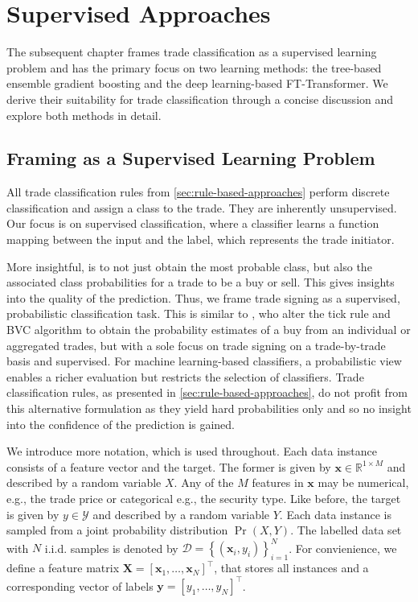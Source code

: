 
\section{Supervised Approaches}\label{sec:supervised-approaches}

The subsequent chapter frames trade classification as a supervised learning problem and has the primary focus on two learning methods: the tree-based ensemble gradient boosting and the deep learning-based FT-Transformer. We derive their suitability for trade classification through a concise discussion and explore both methods in detail.

\subsection{Framing as a Supervised Learning Problem}\label{sec:problem-framing}

All trade classification rules from \cref{sec:rule-based-approaches} perform discrete classification and assign a class to the trade. They are inherently unsupervised. Our focus is on supervised classification, where a classifier learns a function mapping between the input and the label, which represents the trade initiator.

More insightful, is to not just obtain the most probable class, but also the associated class probabilities for a trade to be a buy or sell. This gives insights into the quality of the prediction.
Thus, we frame trade signing as a supervised, probabilistic classification task. This is similar to \textcite[][272]{easleyDiscerningInformationTrade2016}, who alter the tick rule and \gls{BVC} algorithm to obtain the probability estimates of a buy from an individual or aggregated trades, but with a sole focus on trade signing on a trade-by-trade basis and supervised. For machine learning-based classifiers, a probabilistic view enables a richer evaluation but restricts the selection of classifiers. Trade classification rules, as presented in \cref{sec:rule-based-approaches}, do not profit from this alternative formulation as they yield hard probabilities only and so no insight into the confidence of the prediction is gained.

We introduce more notation, which is used throughout. Each data instance consists of a feature vector and the target. The former is given by $\mathbf{x} \in \mathbb{R}^{1 \times M}$ and described by a random variable $X$. Any of the $M$ features in $\mathbf{x}$ may be numerical, e.g., the trade price or categorical e.g., the security type. Like before, the target is given by $y \in \mathcal{Y}$ and described by a random variable $Y$. Each data instance is sampled from a joint probability distribution $\Pr(X, Y)$. The labelled data set with $N$ i.i.d. samples is denoted by $\mathcal{D} =\left\{\left(\mathbf{x}_i, y_i\right)\right\}_{i=1}^N$. For convienience, we define a feature matrix $\mathbf{X}=\left[\mathbf{x}_1,\ldots, \mathbf{x}_N\right]^{\top}$, that stores all instances and a corresponding vector of labels $\mathbf{y}=\left[y_1,\ldots, y_N \right]^{\top}$.

